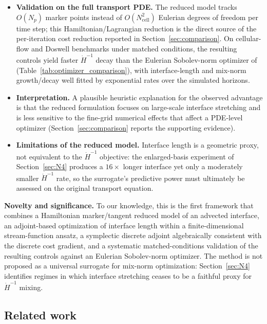 \documentclass[12pt, reqno]{amsart}
\theoremstyle{plain}
\theoremstyle{definition}
\numberwithin{equation}{section}
\numberwithin{figure}{section}
\numberwithin{algorithm}{section}
\begin{document}
\begin{itemize}
\item \textbf{Validation on the full transport PDE.}
The reduced model tracks $O(N_p)$ marker points instead of $O(N_{\mathrm{cell}}^2)$ Eulerian degrees of freedom per time step; this Hamiltonian/Lagrangian reduction is the direct source of the per-iteration cost reduction reported in Section~\ref{sec:comparison}. On cellular-flow and Doswell benchmarks under matched conditions, the resulting controls yield faster $\dot{H}^{-1}$ decay than the Eulerian Sobolev-norm optimizer of \cite{hu2026structure} (Table~\ref{tab:optimizer_comparison}), with interface-length and mix-norm growth/decay well fitted by exponential rates over the simulated horizons.

\item \textbf{Interpretation.}
A plausible heuristic explanation for the observed advantage is that the reduced formulation focuses on large-scale interface stretching and is less sensitive to the fine-grid numerical effects that affect a PDE-level optimizer (Section~\ref{sec:comparison} reports the supporting evidence).

\item \textbf{Limitations of the reduced model.}
Interface length is a geometric proxy, not equivalent to the $\dot{H}^{-1}$ objective: the enlarged-basis experiment of Section~\ref{sec:N4} produces a $16\times$ longer interface yet only a moderately smaller $\dot{H}^{-1}$ rate, so the surrogate's predictive power must ultimately be assessed on the original transport equation.

\end{itemize}

\medskip
\noindent\textbf{Novelty and significance.}
To our knowledge, this is the first framework that combines a Hamiltonian marker/tangent reduced model of an advected interface, an adjoint-based optimization of interface length within a finite-dimensional stream-function ansatz, a symplectic discrete adjoint algebraically consistent with the discrete cost gradient, and a systematic matched-conditions validation of the resulting controls against an Eulerian Sobolev-norm optimizer. The method is not proposed as a universal surrogate for mix-norm optimization: Section~\ref{sec:N4} identifies regimes in which interface stretching ceases to be a faithful proxy for $\dot{H}^{-1}$ mixing.


\subsection{Related work}
\end{document}
